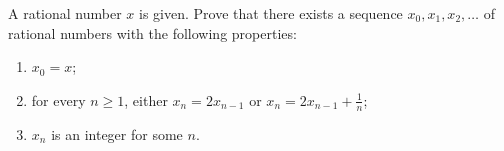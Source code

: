 A rational number $x$ is given.  Prove that there exists a sequence $x_0, x_1, x_2, \ldots$ of rational numbers with the following properties:
\begin{enumerate}[label=(\alph*)]
	\item $x_0=x$;
	\item for every $n\ge1$, either $x_n = 2x_{n-1}$ or $x_n = 2x_{n-1} + \textstyle\frac{1}{n}$;
	\item $x_n$ is an integer for some $n$.
\end{enumerate}